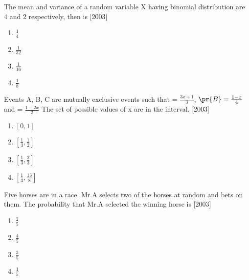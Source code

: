     \item The mean and variance of a random variable X having binomial distribution are 4 and 2 respectively, then  is \hfill [2003]

        \begin{multicols}{4}
        \begin{enumerate}
            \item $\frac{1}{4}$
            \item $\frac{1}{32}$
            \item $\frac{1}{16}$
            \item $\frac{1}{8}$   
        \end{enumerate}
        \end{multicols}

        
    \item Events A, B, C are mutually exclusive events such that = $\frac{3x +1}{3}$, $\pr{B} = \frac{1 - x}{4}$ and  = $\frac{1 - 2x}{2}$ The set of possible values of x are in the interval. \hfill [2003]

        \begin{multicols}{4}
        \begin{enumerate}
            \item $[0 , 1]$
            \item $[\frac{1}{3} , \frac{1}{2}]$
            \item $[\frac{1}{3} , \frac{2}{3}]$
            \item $[\frac{1}{3} , \frac{13}{8}]$
        \end{enumerate}
        \end{multicols}


    \item Five horses are in a race. Mr.A selects two of the horses at random and bets on them. The probability that Mr.A selected the winning horse is  \hfill [2003]

        \begin{multicols}{4}
        \begin{enumerate}
            \item $\frac{2}{5}$
            \item $\frac{4}{5}$
            \item $\frac{3}{5}$
            \item $\frac{1}{5}$   
        \end{enumerate}
        \end{multicols}


